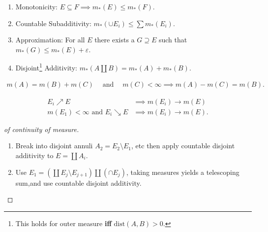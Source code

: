 \begin{proposition}

\envlist

\begin{enumerate}
\def\labelenumi{\arabic{enumi}.}
\tightlist
\item
  Monotonicity: \(E\subseteq F \implies m_*(E) \leq m_*(F)\).
\item
  Countable Subadditivity: \(m_*(\cup E_{i}) \leq \sum m_*(E_{i})\).
\item
  Approximation: For all \(E\) there exists a \(G \supseteq E\) such
  that \(m_*(G) \leq m_*(E) + \varepsilon\).
\item
  Disjoint\footnote{This holds for outer measure \textbf{iff}
    \(\mathrm{dist}(A, B) > 0\).} Additivity:
  \(m_*(A {\coprod}B) = m_*(A) + m_*(B)\).
\end{enumerate}

\end{proposition}

\begin{proposition}

\begin{align*}m(A) = m(B) + m(C) {\quad \operatorname{and} \quad} m(C) < \infty \implies m(A) - m(C) = m(B).\end{align*}

\end{proposition}

\begin{proposition}

\begin{align*}
E_{i} \nearrow E &\implies m(E_{i}) \to m(E) \\
m(E_{1}) < \infty \text{ and } E_{i} \searrow E &\implies m(E_{i}) \to m(E)
.\end{align*}

\end{proposition}

\begin{proof}[of continuity of measure]

\envlist

\begin{enumerate}
\def\labelenumi{\arabic{enumi}.}
\item
  Break into disjoint annuli \(A_{2} = E_{2}\setminus E_{1}\), etc then
  apply countable disjoint additivity to \(E = {\coprod}A_{i}\).
\item
  Use
  \(E_{1} = ({\coprod}E_{j}\setminus E_{j+1}) {\coprod}(\cap E_{j})\),
  taking measures yields a telescoping sum,and use countable disjoint
  additivity.
\end{enumerate}

\end{proof}

